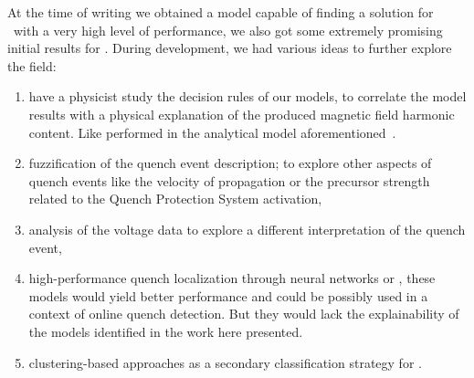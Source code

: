 \documentclass[a4paper, notitlepage]{article}
\begin{document}
At the time of writing we obtained a model capable of finding a solution for \qrp\ with a very
high level of performance, we also got some extremely promising initial results for \qlp. During
development, we had various ideas to further explore the field:
\begin{enumerate}
	\item have a physicist study the decision rules of our models, to correlate the model
	      results with a physical explanation of the produced magnetic field harmonic content.
	      Like performed in the analytical model aforementioned~\cite{mariotto2022-generic}.
	\item fuzzification of the quench event description; to explore other aspects of quench
	      events like the velocity of propagation or the precursor strength related to the Quench Protection System activation,
	\item analysis of the voltage data to explore a different interpretation of the quench event,
	\item high-performance quench localization through neural networks or \svcs, these models
	      would yield better performance and could be possibly used in a context of online
	      quench detection. But they would lack the explainability of the models identified in
	      the work here presented.
	\item clustering-based approaches as a secondary classification strategy for \qlp.
\end{enumerate}

\printbibliography
\end{document}
